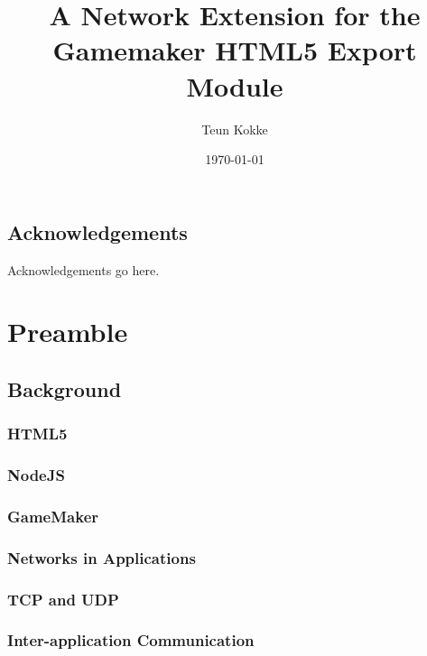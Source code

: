 \documentclass[bsc,frontabs,twoside,singlespacing,parskip,deptreport]{infthesis}     %
\begin{document}
\title{A Network Extension for the Gamemaker HTML5 Export Module}

\author{Teun Kokke}

\date{\today}


\maketitle

\section*{Acknowledgements}
Acknowledgements go here. 

\tableofcontents




\chapter{Preamble}

\section{Background}
\subsection{HTML5}
\subsection{NodeJS}
\subsection{GameMaker}
\subsection{Networks in Applications}
\subsection{TCP and UDP}
\subsection{Inter-application Communication}
\end{document}
